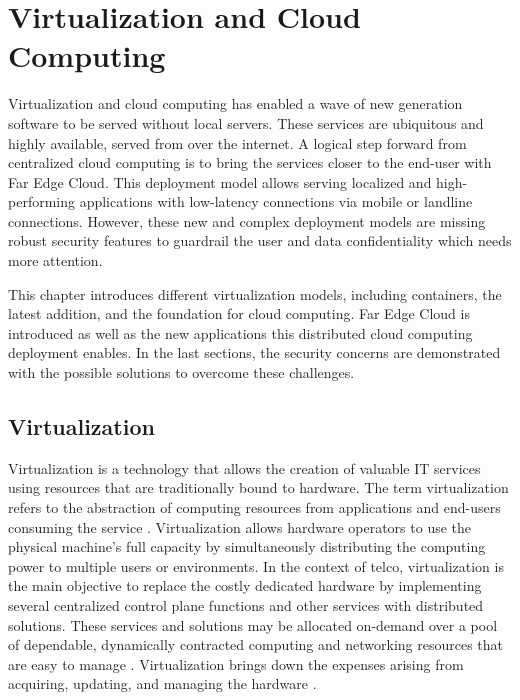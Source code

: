 \chapter{Virtualization and Cloud Computing}
\label{chapter:cloudcomputing}

Virtualization and cloud computing has enabled a wave of new generation software to be served without local servers. These services are ubiquitous and highly available, served from over the internet. A logical step forward from centralized cloud computing is to bring the services closer to the end-user with Far Edge Cloud. This deployment model allows serving localized and high-performing applications with low-latency connections via mobile or landline connections. However, these new and complex deployment models are missing robust security features to guardrail the user and data confidentiality which needs more attention.

This chapter introduces different virtualization models, including containers, the latest addition, and the foundation for cloud computing. Far Edge Cloud is introduced as well as the new applications this distributed cloud computing deployment enables. In the last sections, the security concerns are demonstrated with the possible solutions to overcome these challenges.

\section{Virtualization}

Virtualization is a technology that allows the creation of valuable IT services using resources that are traditionally bound to hardware. The term virtualization refers to the abstraction of computing resources from applications and end-users consuming the service \cite{Xing2012}. Virtualization allows hardware operators to use the physical machine's full capacity by simultaneously distributing the computing power to multiple users or environments. \cite{RedHat} In the context of telco, virtualization is the main objective to replace the costly dedicated hardware by implementing several centralized control plane functions and other services with distributed solutions. These services and solutions may be allocated on-demand over a pool of dependable, dynamically contracted computing and networking resources that are easy to manage \cite{Bosch2011}. Virtualization brings down the expenses arising from acquiring, updating, and managing the hardware \cite{Lingayat2018}\cite{Toimela2017}.

